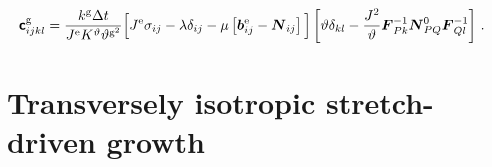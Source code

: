 \documentclass[10pt,letterpaper,oneside]{report}
\newcommand{\ten}[1]{\mbox{\boldmath $#1$}{}}
\newcommand{\tenf}[1]{\mbox{{\sffamily{\bfseries {#1}}}}}
\newcommand{\scas}[1]{\mbox{{\scriptsize{${\rm{#1}}$}}}{}}
\newcommand{\tens}[1]{\mbox{\boldmath{\scriptsize{$#1$}}}{}}
\begin{document}
\begin{align}
\tenf{c}^{\scas{g}}_{ijkl} 
={}& \frac{k^{\scas{g}} \Delta t}{J^{\scas{e}} K^\vartheta \vartheta^{\scas{g}^2} } 
\Big[ J^{\scas{e}} \sigma_{ij} - \lambda \delta_{ij} - \mu \left[ \ten{b}^{\scas{e}}_{ij} - \ten{N}_{ij} \right] \Big] 
\left[ \vartheta \delta_{kl} - \frac{J^2}{\vartheta} \ten{F}^{-1}_{Pk} \ten{N}^0_{PQ} \ten{F}^{-1}_{Ql} \right] \, . 
\label{growth_tangent_area}
\end{align}


\section{Transversely isotropic stretch-driven growth}
\end{document}
